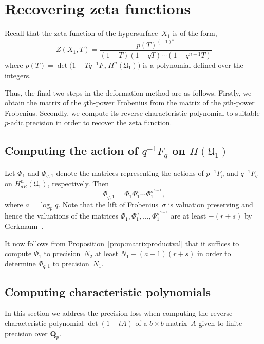 \section{Recovering zeta functions}

Recall that the zeta function of the hypersurface~$X_1$ is of the form,
\begin{equation*}
Z(X_1,T) = \frac{p(T)^{(-1)^n}}{(1 - T) (1 - qT) \dotsm (1 - q^{n-1}T)}
\end{equation*}
where $p(T) = \det \bigl( 1 - T q^{-1} F_q | H^n(\mathfrak{U}_1) \bigr)$ 
is a polynomial defined over the integers.

Thus, the final two steps in the deformation method are as follows.  
Firstly, we obtain the matrix of the $q$th-power Frobenius from the matrix of 
the $p$th-power Frobenius.  Secondly, we compute its reverse characteristic 
polynomial to suitable $p$-adic precision in order to recover the zeta 
function.

\subsection{Computing the action of $q^{-1} F_q$ on $H(\mathfrak{U}_1)$}

Let $\Phi_1$ and $\Phi_{q,1}$ denote the matrices representing the 
actions of $p^{-1} F_p$ and $q^{-1} F_q$ on $H_{dR}^{n}(\mathfrak{U}_1)$, 
respectively.  Then 
\begin{equation*}
\Phi_{q,1} = \Phi_1 \Phi_1^{\sigma} \dotsm \Phi_1^{\sigma^{a-1}},
\end{equation*}
where $a = \log_p q$.  Note that the lift of Frobenius~$\sigma$ 
is valuation preserving and hence the valuations of the matrices 
$\Phi_1, \Phi_1^{\sigma}, \dotsc, \Phi_1^{\sigma^{a-1}}$ are at least 
$-(r+s)$ by Gerkmann~\citep[Lemma~3.3]{Gerkmann2007}.

It now follows from Proposition~\ref{prop:matrixproductval} that 
it suffices to compute $\Phi_1$ to precision~$N_2$ at least 
\mbox{$N_1 + (a-1) (r+s)$} in order to determine $\Phi_{q,1}$ to 
precision~$N_1$.

\subsection{Computing characteristic polynomials}

In this section we address the precision loss when computing the reverse 
characteristic polynomial $\det(1 - t A)$ of a $b \times b$ matrix~$A$ 
given to finite precision over $\mathbf{Q}_p$.

